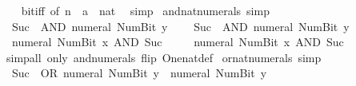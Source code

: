\begin{isabellebody}
%
\isadelimproof
\ \ %
\endisadelimproof
%
\isatagproof
{}\isamarkupfalse%
\ bit{\isacharunderscore}{\kern0pt}{}{\isacharunderscore}{\kern0pt}iff\ {\isacharbrackleft}{\kern0pt}of\ n{\isacharcomma}{\kern0pt}\ \ {\isacharquery}{\kern0pt}{\isacharprime}{\kern0pt}a\ {\isacharequal}{\kern0pt}\ nat{\isacharbrackright}{\kern0pt}\ \isamarkupfalse%
\ simp%
\endisatagproof
{\isafoldproof}%
%
\isadelimproof
\isanewline
%
\endisadelimproof
\isanewline
{}\isamarkupfalse%
\ and{\isacharunderscore}{\kern0pt}nat{\isacharunderscore}{\kern0pt}numerals\ {\isacharbrackleft}{\kern0pt}simp{\isacharbrackright}{\kern0pt}{\isacharcolon}{\kern0pt}\isanewline
\ \ {\isacartoucheopen}Suc\ {}\ AND\ numeral\ {\isacharparenleft}{\kern0pt}Num{\isachardot}{\kern0pt}Bit{}\ y{\isacharparenright}{\kern0pt}\ {\isacharequal}{\kern0pt}\ {}{\isacartoucheclose}\isanewline
\ \ {\isacartoucheopen}Suc\ {}\ AND\ numeral\ {\isacharparenleft}{\kern0pt}Num{\isachardot}{\kern0pt}Bit{}\ y{\isacharparenright}{\kern0pt}\ {\isacharequal}{\kern0pt}\ {}{\isacartoucheclose}\isanewline
\ \ {\isacartoucheopen}numeral\ {\isacharparenleft}{\kern0pt}Num{\isachardot}{\kern0pt}Bit{}\ x{\isacharparenright}{\kern0pt}\ AND\ Suc\ {}\ {\isacharequal}{\kern0pt}\ {}{\isacartoucheclose}\isanewline
\ \ {\isacartoucheopen}numeral\ {\isacharparenleft}{\kern0pt}Num{\isachardot}{\kern0pt}Bit{}\ x{\isacharparenright}{\kern0pt}\ AND\ Suc\ {}\ {\isacharequal}{\kern0pt}\ {}{\isacartoucheclose}\isanewline
%
\isadelimproof
\ \ %
\endisadelimproof
%
\isatagproof
{}\isamarkupfalse%
\ {\isacharparenleft}{\kern0pt}simp{\isacharunderscore}{\kern0pt}all\ only{\isacharcolon}{\kern0pt}\ and{\isacharunderscore}{\kern0pt}numerals\ flip{\isacharcolon}{\kern0pt}\ One{\isacharunderscore}{\kern0pt}nat{\isacharunderscore}{\kern0pt}def{\isacharparenright}{\kern0pt}%
\endisatagproof
{\isafoldproof}%
%
\isadelimproof
\isanewline
%
\endisadelimproof
\isanewline
{}\isamarkupfalse%
\ or{\isacharunderscore}{\kern0pt}nat{\isacharunderscore}{\kern0pt}numerals\ {\isacharbrackleft}{\kern0pt}simp{\isacharbrackright}{\kern0pt}{\isacharcolon}{\kern0pt}\isanewline
\ \ {\isacartoucheopen}Suc\ {}\ OR\ numeral\ {\isacharparenleft}{\kern0pt}Num{\isachardot}{\kern0pt}Bit{}\ y{\isacharparenright}{\kern0pt}\ {\isacharequal}{\kern0pt}\ numeral\ {\isacharparenleft}{\kern0pt}Num{\isachardot}{\kern0pt}Bit{}\ y{\isacharparenright}{\kern0pt}{\isacartoucheclose}\isanewline

\end{isabellebody}
